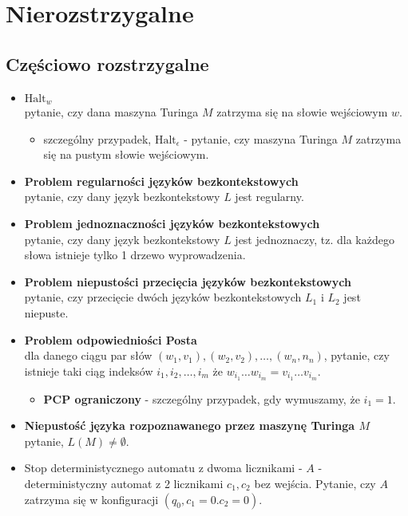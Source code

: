 \documentclass{article}
\theoremstyle{definition}
\theoremstyle{remark}
\begin{document}
\newpage

\section{Nierozstrzygalne}
\subsection{Częściowo rozstrzygalne}
\begin{itemize}
    \item \textbf{$\text{Halt}_w$} \\ 
    pytanie, czy dana maszyna Turinga $M$ zatrzyma się na słowie wejściowym $w$. 
    
    \begin{itemize}
    \item szczególny przypadek, \textbf{$\text{Halt}_{\epsilon}$} - pytanie, czy maszyna Turinga $M$ zatrzyma się na pustym słowie wejściowym.
    \end{itemize}

    \newpage

    \item \textbf{Problem regularności języków bezkontekstowych} \\
    pytanie, czy dany język bezkontekstowy $L$ jest regularny.

    \item \textbf{Problem jednoznaczności języków bezkontekstowych} \\
    pytanie, czy dany język bezkontekstowy $L$ jest jednoznaczy, tz. dla każdego słowa istnieje tylko 1 drzewo wyprowadzenia.

    \item \textbf{Problem niepustości przecięcia języków bezkontekstowych} \\
    pytanie, czy przecięcie dwóch języków bezkontekstowych $L_1$ i $L_2$ jest niepuste.

    \item \textbf{Problem odpowiedniości Posta} \\
    dla danego ciągu par słów $(w_1, v_1), (w_2, v_2), \ldots, (w_n, n_n)$, pytanie, czy istnieje taki ciąg indeksów $i_1, i_2, \ldots, i_m$ że $ w_{i_1} \ldots w_{i_m} = v_{i_1} \ldots v_{i_m}$.
    
    \begin{itemize}
        \item \textbf{PCP ograniczony} - szczególny przypadek, gdy wymuszamy, że $i_1=1$.
    \end{itemize}

    \item \textbf{Niepustość języka rozpoznawanego przez maszynę Turinga $M$} \\
    pytanie, $L(M) \neq \emptyset$.
    
    \item Stop deterministycznego automatu z dwoma licznikami - $A$ - deterministyczny automat z 2 licznikami $c_1, c_2$ bez wejścia. Pytanie, czy $A$ zatrzyma się w konfiguracji $(q_0, c_1 = 0. c_2=0)$.
\end{itemize}
\end{document}
